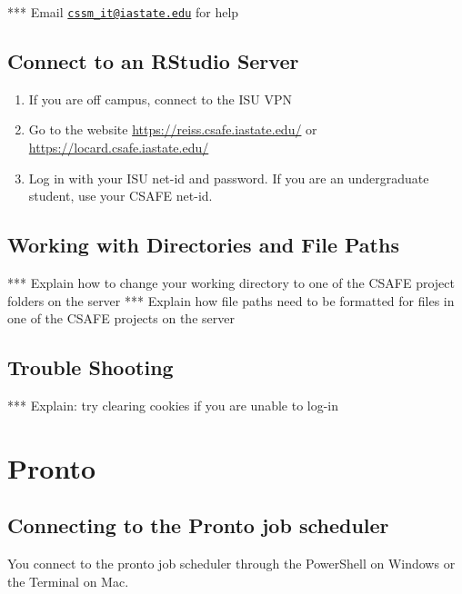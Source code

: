 \documentclass[
]{book}
\providecommand{\tightlist}{%
  \setlength{\itemsep}{0pt}\setlength{\parskip}{0pt}}
\begin{document}
*** Email \href{mailto:cssm_it@iastate.edu}{\nolinkurl{cssm\_it@iastate.edu}} for help

\hypertarget{connect-to-an-rstudio-server}{%
\section{Connect to an RStudio Server}\label{connect-to-an-rstudio-server}}

\begin{enumerate}
\def\labelenumi{\arabic{enumi}.}
\tightlist
\item
  If you are off campus, connect to the ISU VPN
\item
  Go to the website \url{https://reiss.csafe.iastate.edu/} or \url{https://locard.csafe.iastate.edu/}
\item
  Log in with your ISU net-id and password. If you are an undergraduate student, use your CSAFE net-id.
\end{enumerate}

\hypertarget{working-with-directories-and-file-paths}{%
\section{Working with Directories and File Paths}\label{working-with-directories-and-file-paths}}

*** Explain how to change your working directory to one of the CSAFE project folders on the server
*** Explain how file paths need to be formatted for files in one of the CSAFE projects on the server

\hypertarget{trouble-shooting}{%
\section{Trouble Shooting}\label{trouble-shooting}}

*** Explain: try clearing cookies if you are unable to log-in

\hypertarget{pronto}{%
\chapter{Pronto}\label{pronto}}

\hypertarget{pronto}{%
\section{Connecting to the Pronto job scheduler}\label{pronto}}

You connect to the pronto job scheduler through the PowerShell on Windows or the Terminal on Mac.
\end{document}
